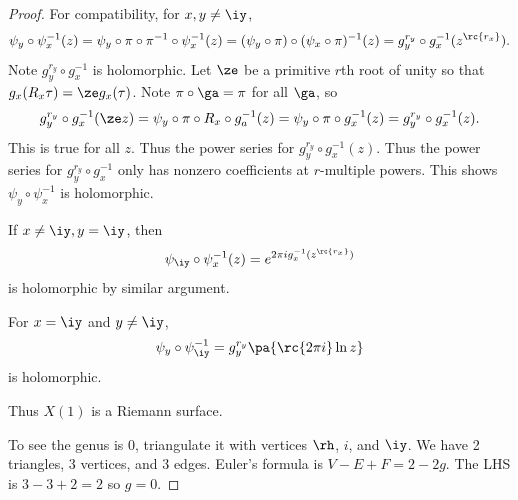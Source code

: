 \begin{proof}
For compatibility, for $x,y\ne \iy$,
\[
\psi_y\circ \psi_x^{-1}(z)
=\psi_y\circ \pi\circ \pi^{-1}\circ \psi_x^{-1}(z)
=(\psi_y\circ \pi)\circ (\psi_x\circ \pi)^{-1}(z)=g_y^{r_y}\circ g_x^{-1}(z^{\rc{r_x}}).
\]
Note $g_y^{r_y}\circ g_x^{-1}$ is holomorphic. Let $\ze$ be a primitive $r$th root of unity so that $g_x(R_x\tau)=\ze g_x(\tau)$. 
Note $\pi\circ \ga=\pi$ for all $\ga$, so
\[
g_y^{r_y}\circ g_x^{-1}(\ze z)=\psi_y\circ \pi\circ R_x\circ g_a^{-1}(z)=\psi_y\circ \pi \circ g_x^{-1}(z)=g_y^{r_y}\circ g_x^{-1}(z).
\]
This is true for all $z$. Thus the power series for $g_y^{r_y}\circ g_{x}^{-1}(z)$. Thus the power series for $g_y^{r_y}\circ g_{x}^{-1}$ only has nonzero coefficients at $r$-multiple powers. This shows $\psi_y\circ \psi_x^{-1}$ is holomorphic.

If $x\ne \iy, y=\iy$, then 
\[
\psi_{\iy}\circ \psi_x^{-1}(z)=e^{2\pi i g_x^{-1}(z^{\rc{r_x}})}
\]
is holomorphic by similar argument.

For $x=\iy$ and $y\ne\iy$,
\[
\psi_y\circ \psi_{\iy}^{-1}=g_y^{r_y}\pa{
\rc{2\pi i}\ln z
}
\]
is holomorphic.

Thus $X(1)$ is a Riemann surface.

To see the genus is 0, triangulate it with vertices $\rh$, $i$, and $\iy$. We have 2 triangles, 3 vertices, and 3 edges. Euler's formula is $V-E+F=2-2g$. The LHS is $3-3+2=2$ so $g=0$.
\end{proof}
